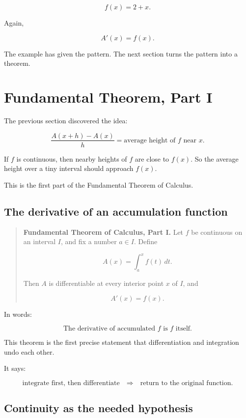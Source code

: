 \[
f(x)=2+x.
\]

Again,

\[
A'(x)=f(x).
\]

The example has given the pattern.  The next section turns the pattern into a theorem.

\section{Fundamental Theorem, Part I}
\label{sec:fundamental-theorem-part-i}

The previous section discovered the idea:

\[
\frac{A(x+h)-A(x)}{h}
=
\text{average height of \(f\) near \(x\)}.
\]

If \(f\) is continuous, then nearby heights of \(f\) are close to \(f(x)\).  So the average
height over a tiny interval should approach \(f(x)\).

This is the first part of the Fundamental Theorem of Calculus.

\subsection{The derivative of an accumulation function}
\label{subsec:derivative-accumulation-function}

\begin{quote}
\textbf{Fundamental Theorem of Calculus, Part I.}
Let \(f\) be continuous on an interval \(I\), and fix a number \(a\in I\).  Define

\[
A(x)=\int_a^x f(t)\,dt.
\]

Then \(A\) is differentiable at every interior point \(x\) of \(I\), and

\[
\boxed{
A'(x)=f(x).
}
\]
\end{quote}

In words:

\[
\boxed{
\text{The derivative of accumulated \(f\) is \(f\) itself.}
}
\]

This theorem is the first precise statement that differentiation and integration undo each
other.

It says:

\[
\text{integrate first, then differentiate}
\quad\Longrightarrow\quad
\text{return to the original function.}
\]

\subsection{Continuity as the needed hypothesis}
\label{subsec:continuity-needed-ftc1}

